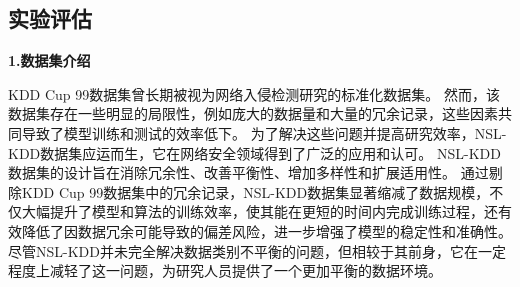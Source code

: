 \subsection{实验评估}
\textbf{1.数据集介绍}\par
KDD Cup 99数据集\cite{tavallaee2009detailed}曾长期被视为网络入侵检测研究的标准化数据集。
然而，该数据集存在一些明显的局限性，例如庞大的数据量和大量的冗余记录，这些因素共同导致了模型训练和测试的效率低下。
为了解决这些问题并提高研究效率，NSL-KDD数据集\cite{revathi2013detailed}应运而生，它在网络安全领域得到了广泛的应用和认可。
NSL-KDD数据集的设计旨在消除冗余性、改善平衡性、增加多样性和扩展适用性。
通过剔除KDD Cup 99数据集中的冗余记录，NSL-KDD数据集显著缩减了数据规模，不仅大幅提升了模型和算法的训练效率，使其能在更短的时间内完成训练过程，还有效降低了因数据冗余可能导致的偏差风险，进一步增强了模型的稳定性和准确性。
尽管NSL-KDD并未完全解决数据类别不平衡的问题，但相较于其前身，它在一定程度上减轻了这一问题，为研究人员提供了一个更加平衡的数据环境。\par

